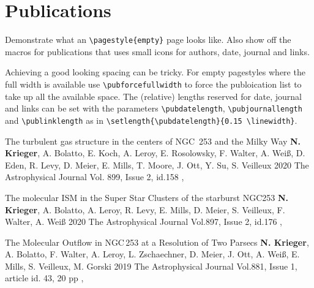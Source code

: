 \documentclass[%
               doublesided,
               paper=a4,
               fontsize=11pt,
               sidebarfontsize=10pt
              ]{my-resume}
\begin{document}
\clearpage
\pagestyle{empty}

\section{Publications}
\pubforcefullwidth

Demonstrate what an \texttt{\textbackslash pagestyle\{empty\}} page looks like.
Also show off the macros for publications that uses small icons for authors, date, journal and links.

Achieving a good looking spacing can be tricky. For empty pagestyles where the full width is available use \texttt{\textbackslash pubforcefullwidth} to force the publoication list to take up all the available space.
The (relative) lengths reserved for date, journal and links can be set with the parameters \texttt{\textbackslash pubdatelength}, \texttt{\textbackslash pubjournallength} and \texttt{\textbackslash publinklength} as in \texttt{\textbackslash setlength\{\textbackslash pubdatelength\}\{0.15 \textbackslash linewidth\}}.
\bigskip

\publication
	{The turbulent gas structure in the centers of NGC~253 and the Milky Way} %
	{\textbf{N. Krieger}, A. Bolatto, E. Koch, A. Leroy, E. Rosolowsky, F. Walter, A. Wei\ss, D. Eden, R. Levy, D. Meier, E. Mills, T. Moore, J. Ott, Y. Su, S. Veilleux} %
	{2020} %
	{The Astrophysical Journal Vol. 899, Issue 2, id.158} %
	{, } %

\publication
	{The molecular ISM in the Super Star Clusters of the starburst NGC253} %
	{\textbf{N. Krieger}, A. Bolatto, A. Leroy, R. Levy, E. Mills, D. Meier, S. Veilleux, F. Walter, A. Wei\ss} %
	{2020} %
	{The Astrophysical Journal Vol.897, Issue 2, id.176} %
	{, } %

\publication
	{The Molecular Outflow in NGC\,253 at a Resolution of Two Parsecs} %
	{\textbf{N. Krieger}, A. Bolatto, F. Walter, A. Leroy, L. Zschaechner, D. Meier, J. Ott, A. Wei\ss, E. Mills, S. Veilleux, M. Gorski} %
	{2019} %
	{The Astrophysical Journal Vol.881, Issue 1, article id. 43, 20 pp} %
	{, } %
\end{document}
